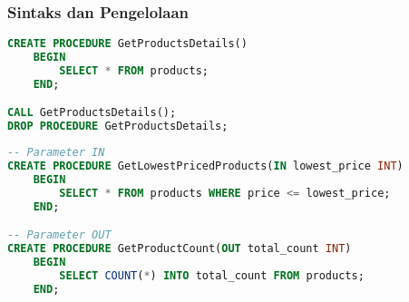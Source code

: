 \documentclass{article}
\begin{document}
\subsubsection{Sintaks dan Pengelolaan}
\begin{lstlisting}[language=SQL, caption={Membuat Stored Procedure Dasar}, captionpos=b]
CREATE PROCEDURE GetProductsDetails()
    BEGIN
        SELECT * FROM products;
    END;

CALL GetProductsDetails();
DROP PROCEDURE GetProductsDetails;
\end{lstlisting}
\begin{lstlisting}[language=SQL, caption={Stored Procedure dengan Parameter IN dan OUT}, captionpos=b]
-- Parameter IN
CREATE PROCEDURE GetLowestPricedProducts(IN lowest_price INT)
    BEGIN
        SELECT * FROM products WHERE price <= lowest_price;
    END;

-- Parameter OUT
CREATE PROCEDURE GetProductCount(OUT total_count INT) 
	BEGIN  
		SELECT COUNT(*) INTO total_count FROM products;
	END;
\end{lstlisting}
\end{document}
